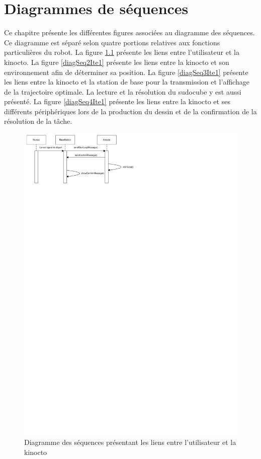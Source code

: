 


\chapter{Diagrammes de séquences}
\label{s:sequences}
Ce chapitre présente les différentes figures associées au diagramme des séquences. Ce diagramme est séparé selon quatre portions relatives aux fonctions particulières du robot. La figure \ref{fig:diagSeq1Ite1} présente les liens entre l'utilisateur et la kinocto. La figure \ref{diagSeq2Ite1} présente les liens entre la kinocto et son environnement afin de déterminer sa position. La figure \ref{diagSeq3Ite1} présente les liens entre la kinocto et la station de base pour la transmission et l'affichage de la trajectoire optimale. La lecture et la résolution du sudocube  y est aussi présenté. La figure \ref{diagSeq4Ite1} présente les liens entre la kinocto et ses différents périphériques lors de la production du dessin et de la confirmation de la résolution de la tâche.
\begin{figure}[htb]
\centering
\includegraphics[scale=1]{fig/diagrammes_sequence1.pdf}
\caption{Diagramme des séquences présentant les liens entre l'utilisateur et la kinocto}
\label{fig:diagSeq1Ite1} 
\end{figure}

